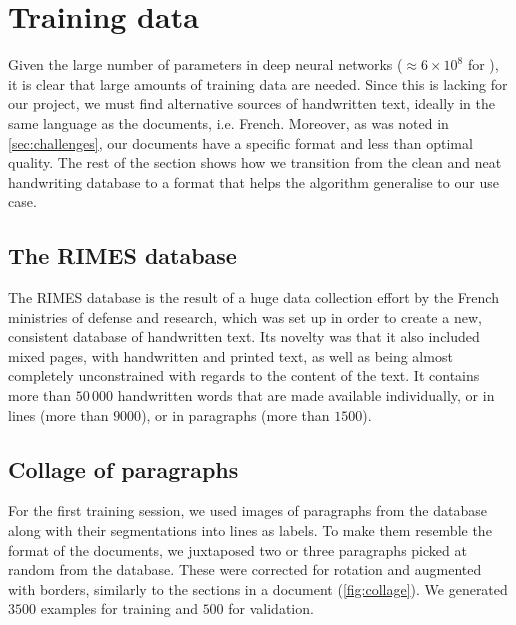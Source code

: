 

\section{Training data}\label{sec:detection_data}
	Given the large number of parameters in deep neural networks (\(\approx 6 \times 10^8\) for \RESNET{}), it is clear that large amounts of training data are needed. Since this is lacking for our project, we must find alternative sources of handwritten text, ideally in the same language as the documents, i.e. French. Moreover, as was noted in \autoref{sec:challenges}, our documents have a specific format and less than optimal quality. The rest of the section shows how we transition from the clean and neat handwriting database to a format that helps the algorithm generalise to our use case.


	\subsection{The RIMES database}\label{sec:rimes}
		The RIMES database \citep{rimes} is the result of a huge data collection effort by the French ministries of defense and research, which was set up in order to create a new, consistent database of handwritten text. Its novelty was that it also included mixed pages, with handwritten and printed text, as well as being almost completely unconstrained with regards to the content of the text.	It contains more than \(50\,000\) handwritten words that are made available individually, or in lines (more than \(9000\)), or in paragraphs (more than \(1500\)).


	\subsection{Collage of paragraphs}
		For the first training session, we used images of paragraphs from the database along with their segmentations into lines as labels. To make them resemble the format of the documents, we juxtaposed two or three paragraphs picked at random from the database. These were corrected for rotation and augmented with borders, similarly to the sections in a document (\autoref{fig:collage}). We generated \(3500\) examples for training and \(500\) for validation.

